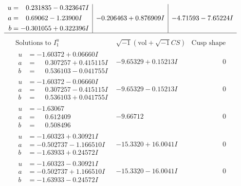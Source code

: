 \documentclass[1p]{elsarticle_modified}
\theoremstyle{definition}
\newcommand{\I}{\sqrt{-1}}
\begin{document}
$$\begin{array}{c|c|c}
\begin{aligned}
u &= \phantom{-}0.231835 - 0.323647 I \\
a &= \phantom{-}0.69062 - 1.23900 I \\
b &= -0.301055 + 0.322396 I\end{aligned}
 & -0.206463 + 0.876909 I & -4.71593 - 7.65224 I\\
 \hline 
 \end{array}$$\newpage$$\begin{array}{c|c|c}  
\text{Solutions to }I^u_{1}& \I (\text{vol} + \sqrt{-1}CS) & \text{Cusp shape}\\
 \hline 
\begin{aligned}
u &= -1.60372 + 0.06660 I \\
a &= \phantom{-}0.307257 + 0.415115 I \\
b &= \phantom{-}0.536103 - 0.041755 I\end{aligned}
 & -9.65329 + 0.15213 I & \phantom{-0.000000 } 0 \\ \hline\begin{aligned}
u &= -1.60372 - 0.06660 I \\
a &= \phantom{-}0.307257 - 0.415115 I \\
b &= \phantom{-}0.536103 + 0.041755 I\end{aligned}
 & -9.65329 - 0.15213 I & \phantom{-0.000000 } 0 \\ \hline\begin{aligned}
u &= -1.63067\phantom{ +0.000000I} \\
a &= \phantom{-}0.612409\phantom{ +0.000000I} \\
b &= \phantom{-}0.508496\phantom{ +0.000000I}\end{aligned}
 & -9.66712\phantom{ +0.000000I} & \phantom{-0.000000 } 0 \\ \hline\begin{aligned}
u &= -1.60323 + 0.30921 I \\
a &= -0.502737 - 1.166510 I \\
b &= -1.63933 + 0.24572 I\end{aligned}
 & -15.3320 + 16.0041 I & \phantom{-0.000000 } 0 \\ \hline\begin{aligned}
u &= -1.60323 - 0.30921 I \\
a &= -0.502737 + 1.166510 I \\
b &= -1.63933 - 0.24572 I\end{aligned}
 & -15.3320 - 16.0041 I & \phantom{-0.000000 } 0 \\ \hline\begin{aligned}

\end{aligned}
\end{array}$$
\end{document}
